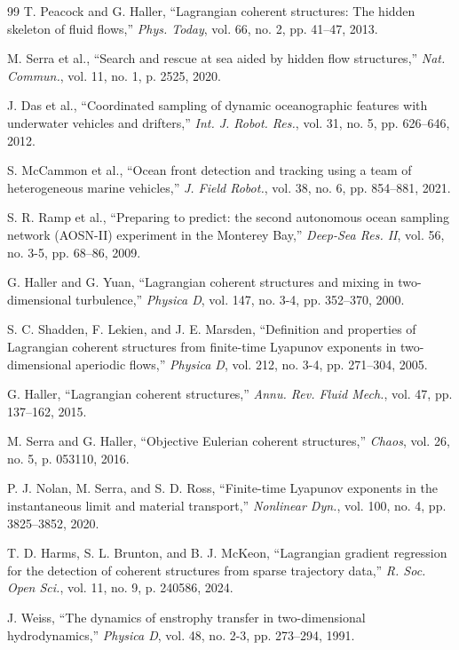 \documentclass[lettersize,journal]{IEEEtran}
\begin{document}
\begin{thebibliography}{99}
 T. Peacock and G. Haller, ``Lagrangian coherent structures: The
hidden skeleton of fluid flows,'' \textit{Phys. Today}, vol. 66, no. 2,
pp. 41--47, 2013.

 M. Serra et al., ``Search and rescue at sea aided by hidden flow
structures,'' \textit{Nat. Commun.}, vol. 11, no. 1, p. 2525, 2020.

 J. Das et al., ``Coordinated sampling of dynamic oceanographic
features with underwater vehicles and drifters,'' \textit{Int. J. Robot.
Res.}, vol. 31, no. 5, pp. 626--646, 2012.

 S. McCammon et al., ``Ocean front detection and tracking using a
team of heterogeneous marine vehicles,'' \textit{J. Field Robot.}, vol. 38,
no. 6, pp. 854--881, 2021.

 S. R. Ramp et al., ``Preparing to predict: the second autonomous
ocean sampling network (AOSN-II) experiment in the Monterey Bay,''
\textit{Deep-Sea Res. II}, vol. 56, no. 3-5, pp. 68--86, 2009.

 G. Haller and G. Yuan, ``Lagrangian coherent structures and mixing
in two-dimensional turbulence,'' \textit{Physica D}, vol. 147, no. 3-4,
pp. 352--370, 2000.

 S. C. Shadden, F. Lekien, and J. E. Marsden, ``Definition and
properties of Lagrangian coherent structures from finite-time Lyapunov
exponents in two-dimensional aperiodic flows,'' \textit{Physica D}, vol. 212,
no. 3-4, pp. 271--304, 2005.

 G. Haller, ``Lagrangian coherent structures,'' \textit{Annu. Rev.
Fluid Mech.}, vol. 47, pp. 137--162, 2015.

 M. Serra and G. Haller, ``Objective Eulerian coherent
structures,'' \textit{Chaos}, vol. 26, no. 5, p. 053110, 2016.

 P. J. Nolan, M. Serra, and S. D. Ross, ``Finite-time Lyapunov
exponents in the instantaneous limit and material transport,''
\textit{Nonlinear Dyn.}, vol. 100, no. 4, pp. 3825--3852, 2020.

 T. D. Harms, S. L. Brunton, and B. J. McKeon, ``Lagrangian
gradient regression for the detection of coherent structures from sparse
trajectory data,'' \textit{R. Soc. Open Sci.}, vol. 11, no. 9,
p. 240586, 2024.

 J. Weiss, ``The dynamics of enstrophy transfer in two-dimensional
hydrodynamics,'' \textit{Physica D}, vol. 48, no. 2-3, pp. 273--294, 1991.


\end{thebibliography}
\end{document}
